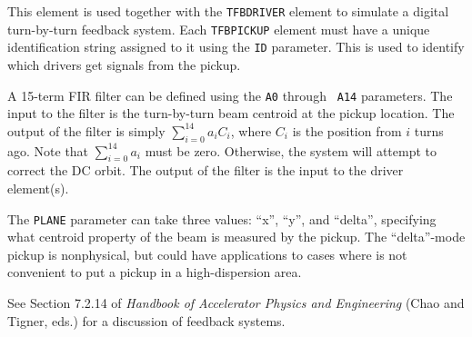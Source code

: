 This element is used together with the {\tt TFBDRIVER} element to
simulate a digital turn-by-turn feedback system.  Each {\tt TFBPICKUP}
element must have a unique identification string assigned to it using
the {\tt ID} parameter.  This is used to identify which drivers get
signals from the pickup.

A 15-term FIR filter can be defined using the {\tt A0} through {\tt
A14} parameters.  The input to the filter is the turn-by-turn beam
centroid at the pickup location.  The output of the filter is simply
$\sum_{i=0}^{14} a_i C_i$, where $C_i$ is the position from $i$ turns
ago.  Note that $\sum_{i=0}^{14} a_i$ must be zero. Otherwise, the
system will attempt to correct the DC orbit.  The output of the filter
is the input to the driver element(s).

The \verb|PLANE| parameter can take three values: ``x'', ``y'', and ``delta'', specifying
what centroid property of the beam is measured by the pickup. The ``delta''-mode pickup
is nonphysical, but could have applications to cases where is not convenient to put a 
pickup in a high-dispersion area.

See Section 7.2.14 of {\em Handbook of Accelerator Physics and Engineering}
(Chao and Tigner, eds.) for a discussion of feedback systems.
